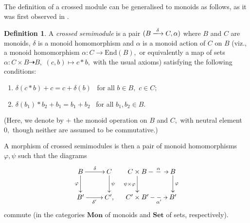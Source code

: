 \documentclass[a4paper]{amsart}
\theoremstyle{plain}
\theoremstyle{definition}
\newtheorem{definition}[subsection]{Definition}
\theoremstyle{remark}
\begin{document}
The definition of a crossed module can be generalised to monoids as follows, as it was first observed in \cite{JS}.
\begin{definition}
\label{def:crossed_semimodule}
A \emph{crossed semimodule} is a pair $(B\xlongrightarrow{\delta} C,\alpha)$ where $B$ and $C$ are monoids, $\delta$ is a monoid homomorphism and $\alpha$ is a monoid action of $C$ on $B$ (viz., a monoid homomorphism $\alpha\colon C\rightarrow\mathrm{End}(B),$ or equivalently a map of sets $\alpha\colon C\times B\dashrightarrow B,$ $(c,b)\mapsto c\ast b,$ with the usual axioms) satisfying the following conditions:
\begin{enumerate}
\item $\delta(c\ast b)+c=c+\delta(b)$ \ for all $b\in B,$ $c\in C;$
\item $\delta(b_1)\ast b_2+b_1=b_1+b_2$ \ for all $b_1,b_2\in B.$
\end{enumerate}
(Here, we denote by $+$ the monoid operation on $B$ and $C,$ with neutral element $0,$ though neither are assumed to be commutative.)
\end{definition}
A morphism of crossed semimodules is then a pair of monoid homomorphisms $\varphi,\psi$ such that the diagrams
\begin{equation}
\label{eqn:mor_crossed_semimod}
\begin{aligned}
\xymatrix{
B \ar[d]_-{\varphi} \ar[r]^-{\delta} &C \ar[d]^-{\psi} \\
{B'} \ar[r]_-{\delta'} &{C',}
}
\
\
\xymatrix{
{C\times B} \ar[d]_-{\psi\times\varphi} \ar@{-->}[r]^-{\alpha} &B \ar[d]^-{\varphi} \\
{C'\times B'} \ar@{-->}[r]_-{\alpha'} &{B'}
}
\end{aligned}
\end{equation}
commute (in the categories $\mathbf{Mon}$ of monoids and $\mathbf{Set}$ of sets, respectively).
\end{document}
